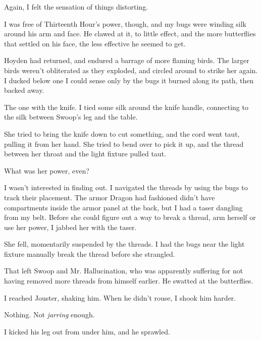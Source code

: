 Again, I felt the sensation of things distorting.



I was free of Thirteenth Hour's power, though, and my bugs were winding silk around his arm and face.  He clawed at it, to little effect, and the more butterflies that settled on his face, the less effective he seemed to get.



Hoyden had returned, and endured a barrage of more flaming birds.  The larger birds weren't obliterated as they exploded, and circled around to strike her again.  I ducked below one I could sense only by the bugs it burned along its path, then backed away.



The one with the knife.  I tied some silk around the knife handle, connecting to the silk between Swoop's leg and the table.



She tried to bring the knife down to cut something, and the cord went taut, pulling it from her hand.  She tried to bend over to pick it up, and the thread between her throat and the light fixture pulled taut.



What was her power, even?



I wasn't interested in finding out.  I navigated the threads by using the bugs to track their placement.  The armor Dragon had fashioned didn't have compartments inside the armor panel at the back, but I had a taser dangling from my belt.  Before she could figure out a way to break a thread, arm herself or use her power, I jabbed her with the taser.



She fell, momentarily suspended by the threads.  I had the bugs near the light fixture manually break the thread before she strangled.



That left Swoop and Mr. Hallucination, who was apparently suffering for not having removed more threads from himself earlier.  He swatted at the butterflies.



I reached Jouster, shaking him.  When he didn't rouse, I shook him harder.



Nothing.  Not \emph{jarring} enough.



I kicked his leg out from under him, and he sprawled.



